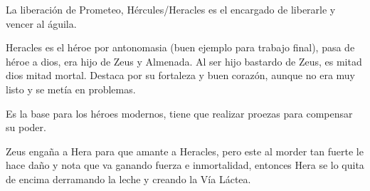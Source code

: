 La liberación de Prometeo, Hércules/Heracles es el encargado de liberarle y vencer al águila.

Heracles es el héroe por antonomasia (buen ejemplo para trabajo final), pasa de héroe a dios, era hijo de Zeus y Almenada. Al ser hijo bastardo de Zeus, es mitad dios mitad mortal. Destaca por su fortaleza y buen corazón, aunque no era muy listo y se metía en problemas.

Es la base para los héroes modernos, tiene que realizar proezas para compensar su poder.

Zeus engaña a Hera para que amante a Heracles, pero este al morder tan fuerte le hace daño y nota que va ganando fuerza e inmortalidad, entonces Hera se lo quita de encima derramando la leche y creando la Vía Láctea.